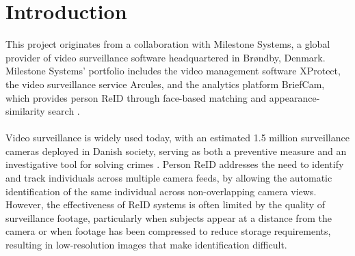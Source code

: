 \chapter{Introduction}
\label{cha:introduction}

This project originates from a collaboration with Milestone Systems, a global provider of video surveillance software headquartered in Brøndby, Denmark. Milestone Systems' portfolio includes the video management software XProtect, the video surveillance service Arcules, and the analytics platform BriefCam, which provides person \acf{ReID} through face-based matching and appearance-similarity search \cite{MilestoneSystems2025}. 
\\\\
Video surveillance is widely used today, with an estimated 1.5 million surveillance cameras deployed in Danish society, serving as both a preventive measure and an investigative tool for solving crimes \cite{overvagningsekspert2025}. Person \acs{ReID} addresses the need to identify and track individuals across multiple camera feeds, by allowing the automatic identification of the same individual across non-overlapping camera views. However, the effectiveness of \acs{ReID} systems is often limited by the quality of surveillance footage, particularly when subjects appear at a distance from the camera or when footage has been compressed to reduce storage requirements, resulting in low-resolution images that make identification difficult.